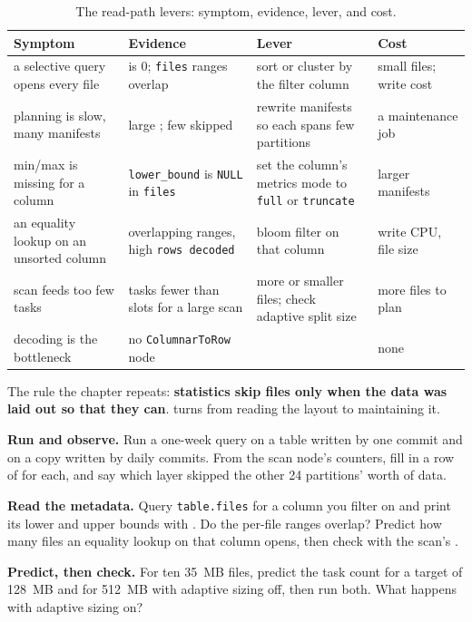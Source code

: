 \begin{table}[htbp]
\centering\footnotesize
\renewcommand{\arraystretch}{1.25}
\begin{tabular}{@{}P{3.3cm}P{3.9cm}P{3.7cm}P{3.1cm}@{}}
\toprule
\textbf{Symptom} & \textbf{Evidence} & \textbf{Lever} & \textbf{Cost} \\
\midrule
a selective query opens every file &  is 0; \texttt{files} ranges overlap & sort or cluster by the filter column & small files; write cost \\
planning is slow, many manifests & large ; few skipped & rewrite manifests so each spans few partitions & a maintenance job \\
min/max is missing for a column & \texttt{lower\_bound} is \texttt{NULL} in \texttt{files} & set the column's metrics mode to \texttt{full} or \texttt{truncate} & larger manifests \\
an equality lookup on an unsorted column & overlapping ranges, high \texttt{rows decoded} & bloom filter on that column & write CPU, file size \\
scan feeds too few tasks & tasks fewer than slots for a large scan & more or smaller files; check adaptive split size & more files to plan \\
decoding is the bottleneck & no \texttt{ColumnarToRow} node &  & none \\
\bottomrule
\end{tabular}
\caption{The read-path levers: symptom, evidence, lever, and cost.}
\label{tab:ice-read-levers}
\end{table}

The rule the chapter repeats: \textbf{statistics skip files only when the data was
laid out so that they can}.  turns from reading the layout
to maintaining it.

\exercisehead
\begin{exercises}
\item \textbf{Run and observe.} Run a one-week query on a table written by one
      commit and on a copy written by daily commits. From the scan node's
      counters, fill in a row of  for each, and
      say which layer skipped the other 24 partitions' worth of data.
\item \textbf{Read the metadata.} Query \texttt{table.files} for a column you
      filter on and print its lower and upper bounds with
      . Do the per-file ranges overlap? Predict how many
      files an equality lookup on that column opens, then check with the scan's
      .
\item \textbf{Predict, then check.} For ten 35~MB files, predict the task count
      for a target of 128~MB and for 512~MB with adaptive sizing off, then run
      both. What happens with adaptive sizing on?
\end{exercises}
